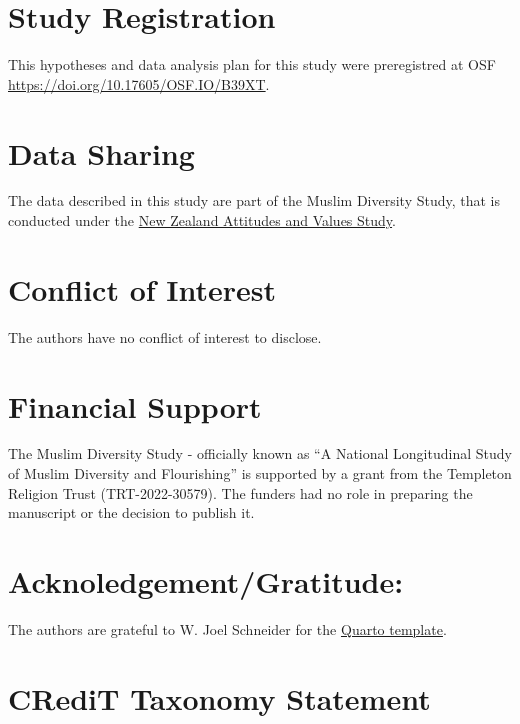 \documentclass[
]{interact}
\begin{document}
\newpage{}

\section{Study Registration}\label{study-registration}

This hypotheses and data analysis plan for this study were preregistred
at OSF \url{https://doi.org/10.17605/OSF.IO/B39XT}.

\section{Data Sharing}\label{data-sharing}

The data described in this study are part of the Muslim Diversity Study,
that is conducted under the \href{https://osf.io/75snb/}{New Zealand
Attitudes and Values Study}.

\section{Conflict of Interest}\label{conflict-of-interest}

The authors have no conflict of interest to disclose.

\section{Financial Support}\label{financial-support}

The Muslim Diversity Study - officially known as ``A National
Longitudinal Study of Muslim Diversity and Flourishing'' is supported by
a grant from the Templeton Religion Trust (TRT-2022-30579). The funders
had no role in preparing the manuscript or the decision to publish it.

\section{Acknoledgement/Gratitude:}\label{acknoledgementgratitude}

The authors are grateful to W. Joel Schneider for the
\href{https://github.com/wjschne/apaquarto}{Quarto template}.

\newpage{}

\section{CRediT Taxonomy Statement}\label{credit-taxonomy-statement}
\end{document}

